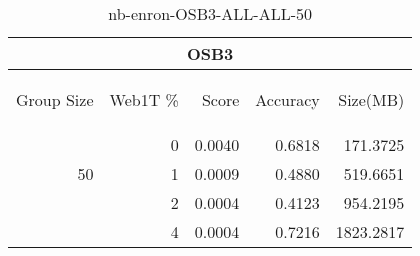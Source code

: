 \begin{center}
\begin{table}[htbp] 
 \begin{center}
\begin{tabular}{ | r | r | r | r | r |}
\hline
\multicolumn{5}{|c|}{OSB3}\\
\hline
\begin{sideways}Group Size\end{sideways} & \begin{sideways}Web1T \%\end{sideways} & \begin{sideways}Score\end{sideways} & \begin{sideways}Accuracy\end{sideways} & \begin{sideways}Size(MB)\end{sideways}\\
\hline
\multirow{3}{*}{50}
 & 0 & 0.0040 & 0.6818 & 171.3725\\ \cline{2-5}
 & 1 & 0.0009 & 0.4880 & 519.6651\\ \cline{2-5}
 & 2 & 0.0004 & 0.4123 & 954.2195\\ \cline{2-5}
 & 4 & 0.0004 & 0.7216 & 1823.2817\\ \cline{2-5}
\hline
\end{tabular}
\caption{nb-enron-OSB3-ALL-ALL-50}
\label{table:nb-enron-OSB3-ALL-ALL-50}
\end{center}
 \end{table}
\end{center}

